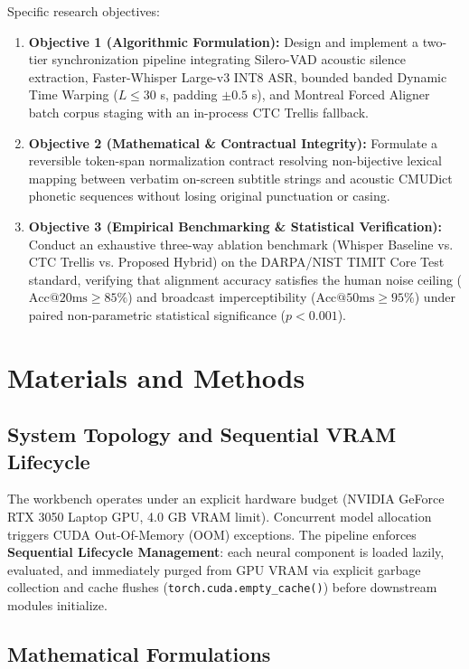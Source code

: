 \documentclass[12pt,a4paper]{article}
\begin{document}
Specific research objectives:
\begin{enumerate}
    \item \textbf{Objective 1 (Algorithmic Formulation):} Design and implement a two-tier synchronization pipeline integrating Silero-VAD acoustic silence extraction, Faster-Whisper Large-v3 INT8 ASR, bounded banded Dynamic Time Warping ($L \le 30$ s, padding $\pm 0.5$ s), and Montreal Forced Aligner batch corpus staging with an in-process CTC Trellis fallback.
    \item \textbf{Objective 2 (Mathematical \& Contractual Integrity):} Formulate a reversible token-span normalization contract resolving non-bijective lexical mapping between verbatim on-screen subtitle strings and acoustic CMUDict phonetic sequences without losing original punctuation or casing.
    \item \textbf{Objective 3 (Empirical Benchmarking \& Statistical Verification):} Conduct an exhaustive three-way ablation benchmark (Whisper Baseline vs. CTC Trellis vs. Proposed Hybrid) on the DARPA/NIST TIMIT Core Test standard, verifying that alignment accuracy satisfies the human noise ceiling ($\text{Acc}@20\text{ms} \ge 85\%$) and broadcast imperceptibility ($\text{Acc}@50\text{ms} \ge 95\%$) under paired non-parametric statistical significance ($p < 0.001$).
\end{enumerate}

\section{Materials and Methods}

\subsection{System Topology and Sequential VRAM Lifecycle}
The workbench operates under an explicit hardware budget (NVIDIA GeForce RTX 3050 Laptop GPU, 4.0 GB VRAM limit). Concurrent model allocation triggers CUDA Out-Of-Memory (OOM) exceptions. The pipeline enforces \textbf{Sequential Lifecycle Management}: each neural component is loaded lazily, evaluated, and immediately purged from GPU VRAM via explicit garbage collection and cache flushes (\texttt{torch.cuda.empty\_cache()}) before downstream modules initialize.

\subsection{Mathematical Formulations}
\end{document}
